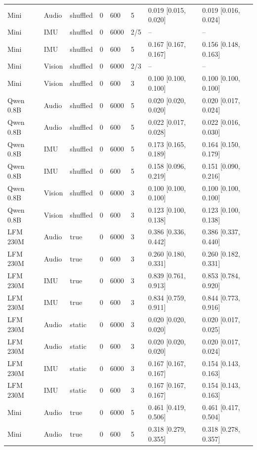 {\begin{longtable}{@{}llllllll@{}}
Mini & Audio & shuffled & 0 & 600 & 5 & 0.019 [0.015, 0.020] & 0.019 [0.016, 0.024] \\
Mini & IMU & shuffled & 0 & 6000 & 2/5 & -- & -- \\
Mini & IMU & shuffled & 0 & 600 & 5 & 0.167 [0.167, 0.167] & 0.156 [0.148, 0.163] \\
Mini & Vision & shuffled & 0 & 6000 & 2/3 & -- & -- \\
Mini & Vision & shuffled & 0 & 600 & 3 & 0.100 [0.100, 0.100] & 0.100 [0.100, 0.100] \\
Qwen 0.8B & Audio & shuffled & 0 & 6000 & 5 & 0.020 [0.020, 0.020] & 0.020 [0.017, 0.024] \\
Qwen 0.8B & Audio & shuffled & 0 & 600 & 5 & 0.022 [0.017, 0.028] & 0.022 [0.016, 0.030] \\
Qwen 0.8B & IMU & shuffled & 0 & 6000 & 5 & 0.173 [0.165, 0.189] & 0.164 [0.150, 0.179] \\
Qwen 0.8B & IMU & shuffled & 0 & 600 & 5 & 0.158 [0.096, 0.219] & 0.151 [0.090, 0.216] \\
Qwen 0.8B & Vision & shuffled & 0 & 6000 & 3 & 0.100 [0.100, 0.100] & 0.100 [0.100, 0.100] \\
Qwen 0.8B & Vision & shuffled & 0 & 600 & 3 & 0.123 [0.100, 0.138] & 0.123 [0.100, 0.138] \\
LFM 230M & Audio & true & 0 & 6000 & 3 & 0.386 [0.336, 0.442] & 0.386 [0.337, 0.440] \\
LFM 230M & Audio & true & 0 & 600 & 3 & 0.260 [0.180, 0.331] & 0.260 [0.182, 0.331] \\
LFM 230M & IMU & true & 0 & 6000 & 3 & 0.839 [0.761, 0.913] & 0.853 [0.784, 0.920] \\
LFM 230M & IMU & true & 0 & 600 & 3 & 0.834 [0.759, 0.911] & 0.844 [0.773, 0.916] \\
LFM 230M & Audio & static & 0 & 6000 & 3 & 0.020 [0.020, 0.020] & 0.020 [0.017, 0.025] \\
LFM 230M & Audio & static & 0 & 600 & 3 & 0.020 [0.020, 0.020] & 0.020 [0.017, 0.024] \\
LFM 230M & IMU & static & 0 & 6000 & 3 & 0.167 [0.167, 0.167] & 0.154 [0.143, 0.163] \\
LFM 230M & IMU & static & 0 & 600 & 3 & 0.167 [0.167, 0.167] & 0.154 [0.143, 0.163] \\
Mini & Audio & true & 0 & 6000 & 5 & 0.461 [0.419, 0.506] & 0.461 [0.417, 0.504] \\
Mini & Audio & true & 0 & 600 & 5 & 0.318 [0.279, 0.355] & 0.318 [0.278, 0.357] \\

\end{longtable}}
